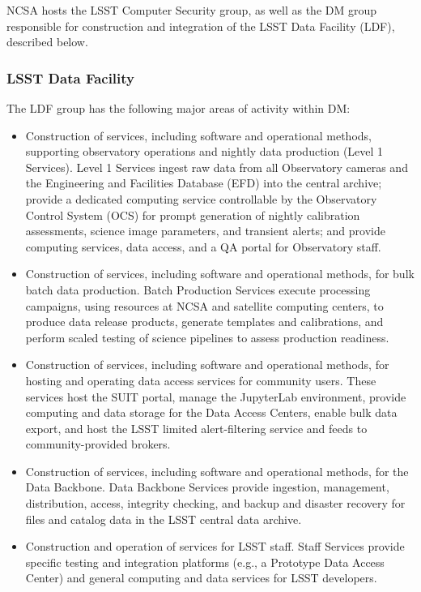 NCSA hosts the \gls{LSST} Computer Security group, as well as the \gls{DM} group responsible for construction and integration of the \gls{LSST} Data Facility (\gls{LDF}), described below.

\subsubsection{LSST Data Facility \label{sect:ldf}}

The \gls{LDF} group has the following major areas of activity within \gls{DM}:

\begin{itemize}
	\item	\gls{Construction} of services, including software and operational methods, supporting observatory operations and nightly data production (Level 1 Services). Level 1 Services ingest raw data from all Observatory cameras and the Engineering and Facilities Database (\gls{EFD}) into the central archive; provide a dedicated computing service controllable by the Observatory Control System (\gls{OCS}) for prompt generation of nightly \gls{calibration} assessments, science image parameters, and \gls{transient} alerts; and provide computing services, data access, and a \gls{QA} portal for Observatory staff.
	\item	\gls{Construction} of services, including software and operational methods, for bulk batch data production. \gls{Batch Production} Services execute processing campaigns, using resources at \gls{NCSA} and satellite computing centers, to produce data release products, generate templates and calibrations, and perform scaled testing of science pipelines to assess production readiness.
	\item	\gls{Construction} of services, including software and operational methods, for hosting and operating data access services for community users. These services host the \gls{SUIT} portal, manage the JupyterLab environment, provide computing and data storage for the Data Access Centers, enable bulk data export, and host the \gls{LSST} limited alert-filtering service and feeds to community-provided brokers.
	\item	\gls{Construction} of services, including software and operational methods, for the \gls{Data Backbone}. \gls{Data Backbone} Services provide ingestion, management, distribution, access, integrity checking, and backup and disaster recovery for files and catalog data in the \gls{LSST} central data archive.
	\item	\gls{Construction} and operation of services for \gls{LSST} staff. Staff Services provide specific testing and integration platforms (e.g., a Prototype \gls{Data Access Center}) and general computing and data services for \gls{LSST} developers.

\end{itemize}
